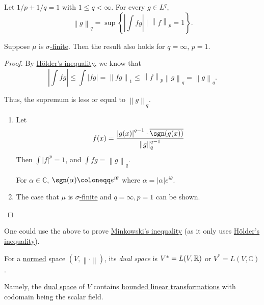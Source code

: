\begin{proposition}\label{prop:Lp-dual-formula}
	Let \(1/p + 1/q = 1\) with \(1 \leq q < \infty\). For every \(g \in L^q\),
	\[
		\left\lVert g\right\rVert_q = \sup\left\{\left\vert \int fg \right\vert  \mid \left\lVert f\right\rVert_p = 1\right\}.
	\]

	Suppose \(\mu \) is \hyperref[def:sigma-finite-measure]{\(\sigma\)-finite}. Then the result also holds for \(q = \infty\), \(p = 1\).
\end{proposition}
\begin{proof}
	By \hyperref[thm:Holder-inequality]{Hölder's inequality}, we know that
	\[
		\left\vert \int fg \right\vert  \leq \int \left\vert fg \right\vert  = \left\lVert fg\right\rVert_1 \leq \left\lVert f\right\rVert _p \left\lVert g\right\rVert_q = \left\lVert g\right\rVert_q.
	\]

	Thus, the supremum is less or equal to \(\left\lVert g\right\rVert_q\).

	\begin{enumerate}
		\item Let
		      \[
			      f(x) = \frac{\left\vert g(x) \right\vert ^{q-1}\cdot \overline{\sgn(g(x))}}{\left\lVert g\right\rVert_q^{q-1}}
		      \]
		      Then \(\int \left\vert f \right\vert ^p = 1\), and \(\int fg = \left\lVert g\right\rVert _q\).
		      \begin{note}
			      For \(\alpha \in \mathbb{C}\), \(\sgn (\alpha) \coloneqq e^{i\theta}\) where \(\alpha = \left\vert \alpha \right\vert e^{i\theta}\).
		      \end{note}
		\item The case that \(\mu\) is \hyperref[def:sigma-finite-measure]{\(\sigma\)-finite} and \(q = \infty, p = 1\) can be shown.
	\end{enumerate}
\end{proof}

\begin{remark}
	One could use the above to prove \hyperref[thm:Minkowski-inequality]{Minkowski's inequality} (as it only uses \hyperref[thm:Holder-inequality]{Hölder's inequality}).
\end{remark}

\begin{definition}\label{def:dual-space}
	For a \hyperref[def:norm]{normed} space \((V, \left\lVert \cdot\right\rVert )\), its \emph{dual space} is \(V^\ast = L(V, \mathbb{\MakeUppercase{r}} )\) or
	\(V^\ast = L(V, \mathbb{C})\).
\end{definition}
\begin{remark}
	Namely, the \hyperref[def:dual-space]{dual space} of \(V\) contains \hyperref[def:bounded-linear-transformation]{bounded linear transformations} with codomain being the scalar field.
\end{remark}

